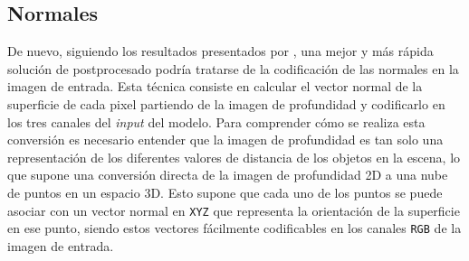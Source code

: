 \documentclass[12pt,a4paper]{report}
\begin{document}
\subsection{Normales}
\label{subsec:normals}
De nuevo, siguiendo los resultados presentados por \cite{eitel2015multimodaldeeplearningrobust}, una mejor y más rápida solución de postprocesado podría tratarse de la codificación de las normales en la imagen de entrada. Esta técnica consiste en calcular el vector normal de la superficie de cada pixel partiendo de la imagen de profundidad y codificarlo en los tres canales del \textit{input} del modelo. Para comprender cómo se realiza esta conversión es necesario entender que la imagen de profundidad es tan solo una representación de los diferentes valores de distancia de los objetos en la escena, lo que supone una conversión directa de la imagen de profundidad 2D a una nube de puntos en un espacio 3D. Esto supone que cada uno de los puntos se puede asociar con un vector normal en \texttt{XYZ} que representa la orientación de la superficie en ese punto, siendo estos vectores fácilmente codificables en los canales \texttt{RGB} de la imagen de entrada.
\end{document}
